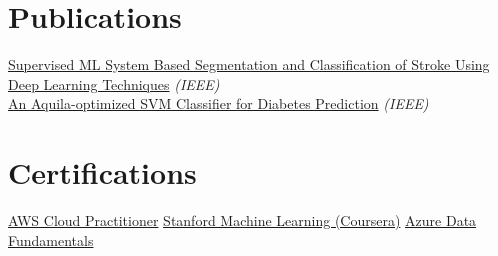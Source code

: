\documentclass[a4paper,10pt]{article}
\begin{document}
\section{\textbf{Publications}}
\footnotesize{
\href{https://ieeexplore.ieee.org/document/9792818}{Supervised ML System Based Segmentation and Classification of Stroke Using Deep Learning Techniques} \textit{(IEEE)} \\
\href{https://ieeexplore.ieee.org/document/10060334}{An Aquila-optimized SVM Classifier for Diabetes Prediction} \textit{(IEEE)}
}
\vspace{-3mm}

\section{\textbf{Certifications}}
\footnotesize{
\href{https://drive.google.com/file/d/1a3exoiS79RS3q8vSJHT-PpkczSPg54EZ/view}{AWS Cloud Practitioner} \hfill \href{https://drive.google.com/file/d/1At3BLkqJ9vuhPPUCcrNAw9yNH5li7XdQ/view}{Stanford Machine Learning (Coursera)} \hfill \href{https://drive.google.com/file/d/1VBJjfRMsIm8BckoUtLUV7ZbY88Jju2qT/view}{Azure Data Fundamentals}
}
\end{document}
